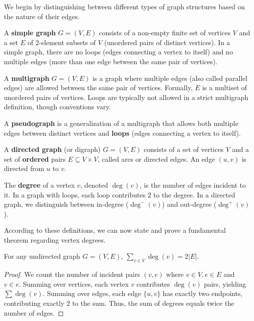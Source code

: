 \documentclass[oneside]{book}
\begin{document}
We begin by distinguishing between different types of graph structures based on the nature of their edges.

\begin{definition}
A \textbf{simple graph} $G = (V, E)$ consists of a non-empty finite set of vertices $V$ and a set $E$ of 2-element subsets of $V$ (unordered pairs of distinct vertices). In a simple graph, there are no loops (edges connecting a vertex to itself) and no multiple edges (more than one edge between the same pair of vertices).
\end{definition}

\begin{definition}[Multigraph]
A \textbf{multigraph} $G = (V, E)$ is a graph where multiple edges (also called parallel edges) are allowed between the same pair of vertices. Formally, $E$ is a multiset of unordered pairs of vertices. Loops are typically not allowed in a strict multigraph definition, though conventions vary.
\end{definition}

\begin{definition}[Pseudograph]
A \textbf{pseudograph} is a generalization of a multigraph that allows both multiple edges between distinct vertices and \textbf{loops} (edges connecting a vertex to itself).
\end{definition}

\begin{definition}
A \textbf{directed graph} (or digraph) $G = (V, E)$ consists of a set of vertices $V$ and a set of \textbf{ordered} pairs $E \subseteq V \times V$, called arcs or directed edges. An edge $(u, v)$ is directed from $u$ to $v$.
\end{definition}

\begin{definition}[Degree]
The \textbf{degree} of a vertex $v$, denoted $\deg(v)$, is the number of edges incident to it. In a graph with loops, each loop contributes 2 to the degree. In a directed graph, we distinguish between in-degree ($\deg^-(v)$) and out-degree ($\deg^+(v)$).
\end{definition}

According to these definitions, we can now state and prove a fundamental theorem regarding vertex degrees.

\begin{theorem}
For any undirected graph $G = (V, E)$, $\sum_{v \in V} \deg(v) = 2|E|$.
\end{theorem}
\begin{proof}
We count the number of incident pairs $(v, e)$ where $v \in V, e \in E$ and $v \in e$.
Summing over vertices, each vertex $v$ contributes $\deg(v)$ pairs, yielding $\sum \deg(v)$.
Summing over edges, each edge $\{u, v\}$ has exactly two endpoints, contributing exactly 2 to the sum.
Thus, the sum of degrees equals twice the number of edges.
\end{proof}
\end{document}
